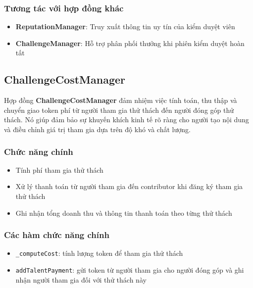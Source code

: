 \subsubsection{Tương tác với hợp đồng khác}

\begin{itemize}
  \item \textbf{ReputationManager}: Truy xuất thông tin uy tín của kiểm duyệt viên
  \item \textbf{ChallengeManager}: Hỗ trợ phân phối thưởng khi phiên kiểm duyệt hoàn tất
\end{itemize}

\subsection{ChallengeCostManager}

Hợp đồng \textbf{ChallengeCostManager} đảm nhiệm việc tính toán, thu thập và chuyển giao token phí từ người tham gia thử thách đến người đóng góp thử thách.
Nó giúp đảm bảo sự khuyến khích kinh tế rõ ràng cho người tạo nội dung và điều chỉnh giá trị tham gia dựa trên độ khó và chất lượng.

\subsubsection{Chức năng chính}

\begin{itemize}
  \item Tính phí tham gia thử thách
  \item Xử lý thanh toán từ người tham gia đến contributor khi đăng ký tham gia thử thách
  \item Ghi nhận tổng doanh thu và thông tin thanh toán theo từng thử thách
\end{itemize}

\subsubsection{Các hàm chức năng chính}

\begin{itemize}
  \item \texttt{\_computeCost}: tính lượng token để tham gia thử thách
  \item \texttt{addTalentPayment}: gửi token từ người tham gia cho người đóng góp và ghi nhận người tham gia đối với thử thách này
\end{itemize}

